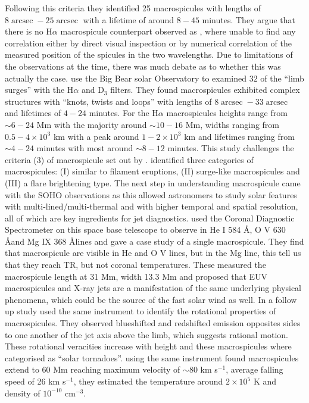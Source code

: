 \documentclass[12pt]{ociamthesis}
\DeclareMathOperator{\arcsec}{arcsec}
\begin{document}
Following this criteria they identified 25 macrospicules with lengths of $8\arcsec - 25\arcsec$ with a lifetime of around $8-45$ minutes. They argue that there is no H$\alpha$ macrospicule counterpart observed as \cite{Moe1975SoPh4065K}, where unable to find any correlation either by direct visual inspection or by numerical correlation of the measured position of the spicules in the two wavelengths. Due to limitations of the observations at the time, there was much debate as to whether this was actually the case. \cite{Labonte1979SoPh61283L} use the Big Bear solar Observatory to examined  $32$ of the ``limb surges'' with the H$\alpha$ and D$_3$ filters. They found macrospicules exhibited complex structures with ``knots, twists and loops'' with lengths of $8\arcsec-33\arcsec$ and lifetimes of $4-24$ minutes. For the H$\alpha$ macrospicules heights range from $\sim 6-24$ Mm with the majority around $\sim 10-16$ Mm, widths ranging from $0.5-4\times 10^3$ km with a peak around $1-2\times 10^3$ km and lifetimes ranging from $\sim 4-24$ minutes with most around $\sim 8-12$ minutes. This study challenges the criteria (3) of macrospicule set out by \cite{Bohlin1975ApJ197L133B}. \cite{Labonte1979SoPh61283L} identified three categories of macrospicules: (I) similar to filament eruptions, (II) surge-like macrospicules and (III) a flare brightening type. The next step in understanding macrospicule came with the SOHO observations as this allowed astronomers to study solar features with multi-lined/multi-thermal and with higher temporal and spatial resolution, all of which are key ingredients for jet diagnostics. \cite{Pike1997SoPh175457P} used the Coronal Diagnostic Spectrometer on this space base telescope to observe in He I 584 \AA, O V 630 \AA and Mg IX 368 \AA lines and gave a case study of a single macrospicule. They find that macrospicule are visible in He and O V lines, but in the Mg line, this tell us that they reach TR, but not coronal temperatures. These measured the macrospicule length at 31 Mm, width 13.3 Mm and proposed that EUV macrospicules and X-ray jets are a manifestation of the same underlying physical phenomena, which could be the source of the fast solar wind as well. In a follow up study \cite{Pike1998SoPh182333P} used the same instrument to identify the rotational properties of macrospicules. They observed blueshifted and redshifted emission opposites sides to one another of the jet axis above the limb, which suggests rational motion. These rotational veracities increase with height and these macrospicules where categorised as ``solar tornadoes''. \cite{Parenti2002AA384303P} using the same instrument found macrospicules extend to $60$ Mm reaching maximum velocity of $\sim 80$ km s$^{-1}$, average falling speed of 26 km s$^{-1}$, they estimated the temperature around $2\times10^5$ K and density of $10^{-10}$ cm$^{-3}$. \\ \\
\end{document}
